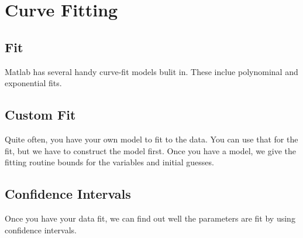 
\pagebreak
\section{Curve Fitting}

\subsection{Fit}
Matlab has several handy curve-fit models bulit in.
 These inclue polynominal and exponential fits.

\begin{quote}

\end{quote}

\pagebreak
\subsection{Custom Fit}
Quite often, you have your own model to fit to the data.
 You can use that for the fit, but we have to construct the model first.
 Once you have a model, we give the fitting routine bounds for the variables and initial guesses.

\begin{quote}
 
\end{quote}

\pagebreak
\subsection{Confidence Intervals}
Once you have your data fit, we can find out well the parameters are fit by using confidence intervals.

\begin{quote}
 
\end{quote}

